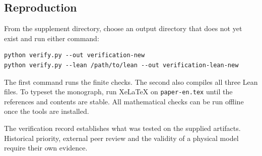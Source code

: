 \subsection{Reproduction}
From the supplement directory, choose an output directory that does not yet exist and run either command:
\begin{verbatim}
python verify.py --out verification-new
python verify.py --lean /path/to/lean --out verification-lean-new
\end{verbatim}
The first command runs the finite checks. The second also compiles all three Lean files. To typeset the monograph, run XeLaTeX on \texttt{paper-en.tex} until the references and contents are stable. All mathematical checks can be run offline once the tools are installed.

The verification record establishes what was tested on the supplied artifacts. Historical priority, external peer review and the validity of a physical model require their own evidence.
